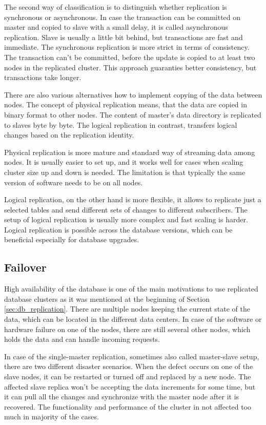 \documentclass[
  digital, %
  twoside, %
  table,   %
  lof,     %
  lot,     %
]{fithesis3}
\begin{document}
The second way of classification is to distinguish whether replication is synchronous or asynchronous. In case the transaction can be committed on master and copied to slave with a small delay, it is called asynchronous replication. Slave is usually a little bit behind, but transactions are fast and immediate. The synchronous replication is more strict in terms of consistency. The transaction can't be committed, before the update is copied to at least two nodes in the replicated cluster. This approach guaranties better consistency, but transactions take longer.

There are also various alternatives how to implement copying of the data between nodes. The concept of physical replication means, that the data are copied in binary format to other nodes. The content of master's data directory is replicated to slaves byte by byte. The logical replication in contrast, transfers logical changes based on the replication identity.

Physical replication is more mature and standard way of streaming data among nodes. It is usually easier to set up, and it works well for cases when scaling cluster size up and down is needed. The limitation is that typically the same version of software needs to be on all nodes.

Logical replication, on the other hand is more flexible, it allows to replicate just a selected tables and send different sets of changes to different subscribers. The setup of logical replication is usually more complex and fast scaling is harder. Logical replication is possible across the database versions, which can be beneficial especially for database upgrades.

\subsection{Failover} \label{sec:failover}
High availability of the database is one of the main motivations to use replicated database clusters as it was mentioned at the beginning of Section \ref{sec:db_replication}. There are multiple nodes keeping the current state of the data, which can be located in the different data centers. In case of the software or hardware failure on one of the nodes, there are still several other nodes, which holds the data and can handle incoming requests.

In case of the single-master replication, sometimes also called master-slave setup, there are two different disaster scenarios. When the defect occurs on one of the slave nodes, it can be restarted or turned off and replaced by a new node. The affected slave replica won't be accepting the data increments for some time, but it can pull all the changes and synchronize with the master node after it is recovered. The functionality and performance of the cluster in not affected too much in majority of the cases.
\end{document}
